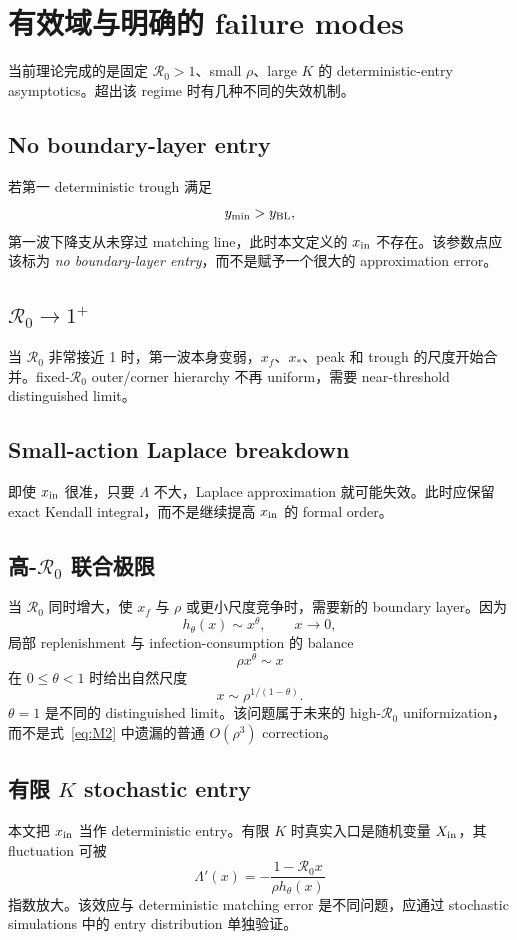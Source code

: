 \documentclass[11pt,a4paper]{ctexart}
\newcommand{\Rzero}{\mathcal R_0}
\newcommand{\BL}{y_{\rm BL}}
\begin{document}
\section{有效域与明确的 failure modes}
当前理论完成的是固定 $\Rzero>1$、small $\rho$、large $K$ 的 deterministic-entry asymptotics。超出该 regime 时有几种不同的失效机制。

\subsection{No boundary-layer entry}
若第一 deterministic trough 满足
\[
y_{\min}>\BL,
\]
第一波下降支从未穿过 matching line，此时本文定义的 $x_{\rm in}$ 不存在。该参数点应该标为 \emph{no boundary-layer entry}，而不是赋予一个很大的 approximation error。

\subsection{$\Rzero\to1^+$}
当 $\Rzero$ 非常接近 1 时，第一波本身变弱，$x_f$、$x_*$、peak 和 trough 的尺度开始合并。fixed-$\Rzero$ outer/corner hierarchy 不再 uniform，需要 near-threshold distinguished limit。

\subsection{Small-action Laplace breakdown}
即使 $x_{\rm in}$ 很准，只要 $\Lambda$ 不大，Laplace approximation 就可能失效。此时应保留 exact Kendall integral，而不是继续提高 $x_{\rm in}$ 的 formal order。

\subsection{高-$\Rzero$ 联合极限}
当 $\Rzero$ 同时增大，使 $x_f$ 与 $\rho$ 或更小尺度竞争时，需要新的 boundary layer。因为
\[
h_\theta(x)\sim x^\theta,
\qquad x\to0,
\]
局部 replenishment 与 infection-consumption 的 balance
\[
\rho x^\theta\sim x
\]
在 $0\leq\theta<1$ 时给出自然尺度
\begin{equation}
\label{eq:highRscale}
x\sim\rho^{1/(1-\theta)}.
\end{equation}
$\theta=1$ 是不同的 distinguished limit。该问题属于未来的 high-$\Rzero$ uniformization，而不是式~\eqref{eq:M2} 中遗漏的普通 $O(\rho^3)$ correction。

\subsection{有限 $K$ stochastic entry}
本文把 $x_{\rm in}$ 当作 deterministic entry。有限 $K$ 时真实入口是随机变量 $X_{\rm in}$，其 fluctuation 可被
\[
\Lambda'(x)
=-\frac{1-\Rzero x}{\rho h_\theta(x)}
\]
指数放大。该效应与 deterministic matching error 是不同问题，应通过 stochastic simulations 中的 entry distribution 单独验证。
\end{document}
